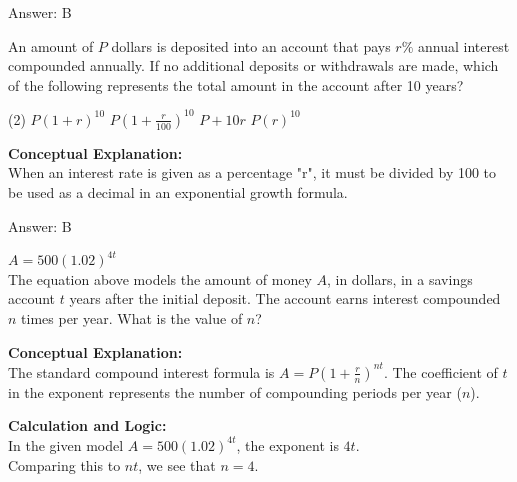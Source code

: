 \documentclass[11pt,paper=a4,answers]{exam}
\begin{document}
\begin{questions}
\begin{solution}
\vspace{25pt}

Answer: \colorbox{yellow!100}{B}
\end{solution}

\vspace{40pt}

\question
An amount of $P$ dollars is deposited into an account that pays $r\%$ annual interest compounded annually. If no additional deposits or withdrawals are made, which of the following represents the total amount in the account after 10 years?
\begin{tasks}(2)
    \task $P(1 + r)^{10}$
    \task $P(1 + \frac{r}{100})^{10}$
    \task $P + 10r$
    \task $P(r)^{10}$
\end{tasks}

\begin{solution}
\textbf{Conceptual Explanation:} \\
When an interest rate is given as a percentage "r", it must be divided by 100 to be used as a decimal in an exponential growth formula.

\vspace{25pt}

Answer: \colorbox{yellow!100}{B}
\end{solution}

\vspace{40pt}

\question
$A = 500(1.02)^{4t}$ \\
The equation above models the amount of money $A$, in dollars, in a savings account $t$ years after the initial deposit. The account earns interest compounded $n$ times per year. What is the value of $n$?

\begin{solution}
\textbf{Conceptual Explanation:} \\
The standard compound interest formula is $A = P(1 + \frac{r}{n})^{nt}$. The coefficient of $t$ in the exponent represents the number of compounding periods per year ($n$).

\vspace{20pt}

\textbf{Calculation and Logic:} \\
In the given model $A = 500(1.02)^{4t}$, the exponent is $4t$. \\
Comparing this to $nt$, we see that $n = 4$.


\end{solution}
\end{questions}
\end{document}
